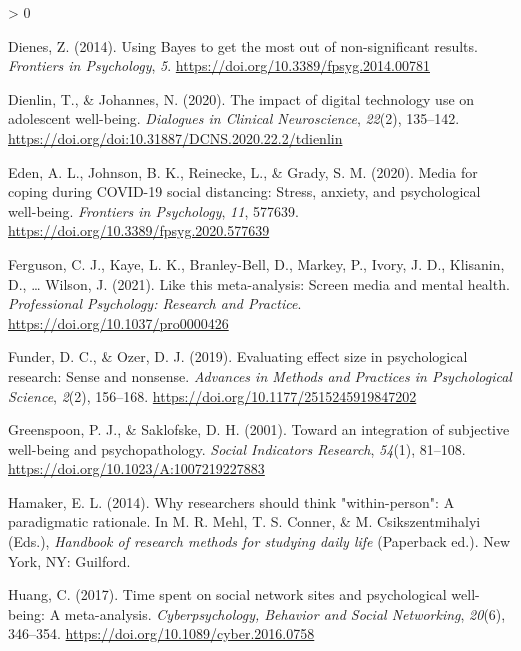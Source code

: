 \documentclass[
  english,
  man,mask,floatsintext]{apa6}
\newlength{\cslhangindent}
\newenvironment{CSLReferences}[2] %
 {%
  \setlength{\parindent}{0pt}
  \ifodd #1 \everypar{\setlength{\hangindent}{\cslhangindent}}\ignorespaces\fi
  \ifnum #2 > 0
  \setlength{\parskip}{#2\baselineskip}
  \fi
 }%
 {}
\begin{document}
\begin{CSLReferences}{1}{0}
\leavevmode\hypertarget{ref-dienesUsingBayesGet2014}{}%
Dienes, Z. (2014). Using {Bayes} to get the most out of non-significant results. \emph{Frontiers in Psychology}, \emph{5}. \url{https://doi.org/10.3389/fpsyg.2014.00781}

\leavevmode\hypertarget{ref-dienlinImpactDigitalTechnology2020}{}%
Dienlin, T., \& Johannes, N. (2020). The impact of digital technology use on adolescent well-being. \emph{Dialogues in Clinical Neuroscience}, \emph{22}(2), 135--142. \url{https://doi.org/doi:10.31887/DCNS.2020.22.2/tdienlin}

\leavevmode\hypertarget{ref-edenMediaCopingCOVID192020}{}%
Eden, A. L., Johnson, B. K., Reinecke, L., \& Grady, S. M. (2020). Media for coping during {COVID}-19 social distancing: {Stress}, anxiety, and psychological well-being. \emph{Frontiers in Psychology}, \emph{11}, 577639. \url{https://doi.org/10.3389/fpsyg.2020.577639}

\leavevmode\hypertarget{ref-fergusonThisMetaanalysisScreen2021}{}%
Ferguson, C. J., Kaye, L. K., Branley-Bell, D., Markey, P., Ivory, J. D., Klisanin, D., \ldots{} Wilson, J. (2021). Like this meta-analysis: {Screen} media and mental health. \emph{Professional Psychology: Research and Practice}. \url{https://doi.org/10.1037/pro0000426}

\leavevmode\hypertarget{ref-funderEvaluatingEffectSize2019}{}%
Funder, D. C., \& Ozer, D. J. (2019). Evaluating effect size in psychological research: {Sense} and nonsense. \emph{Advances in Methods and Practices in Psychological Science}, \emph{2}(2), 156--168. \url{https://doi.org/10.1177/2515245919847202}

\leavevmode\hypertarget{ref-greenspoonIntegrationSubjectiveWellbeing2001}{}%
Greenspoon, P. J., \& Saklofske, D. H. (2001). Toward an integration of subjective well-being and psychopathology. \emph{Social Indicators Research}, \emph{54}(1), 81--108. \url{https://doi.org/10.1023/A:1007219227883}

\leavevmode\hypertarget{ref-hamakerWhyResearchersShould2014}{}%
Hamaker, E. L. (2014). Why researchers should think "within-person": {A} paradigmatic rationale. In M. R. Mehl, T. S. Conner, \& M. Csikszentmihalyi (Eds.), \emph{Handbook of research methods for studying daily life} (Paperback ed.). New York, NY: Guilford.

\leavevmode\hypertarget{ref-huangTimeSpentSocial2017}{}%
Huang, C. (2017). Time spent on social network sites and psychological well-being: {A} meta-analysis. \emph{Cyberpsychology, Behavior and Social Networking}, \emph{20}(6), 346--354. \url{https://doi.org/10.1089/cyber.2016.0758}


\end{CSLReferences}
\end{document}
